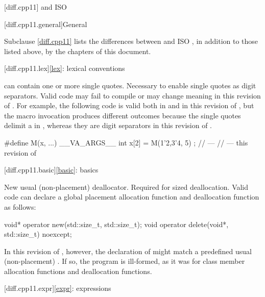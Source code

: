 [diff.cpp11]{\Cpp{} and ISO \CppXI{}}

[diff.cpp11.general]{General}

\pnum
{}%
Subclause \ref{diff.cpp11} lists the differences between \Cpp{} and
ISO \CppXI{},
in addition to those listed above,
by the chapters of this document.

[diff.cpp11.lex]{\ref{lex}: lexical conventions}

\change
{} can contain one or more single quotes.
\rationale
Necessary to enable single quotes as digit separators.
\effect
Valid \CppXI{} code may fail to compile or may change meaning in this
revision of \Cpp{}. For example, the following code is valid both in \CppXI{} and in
this revision of \Cpp{}, but the macro invocation produces different outcomes
because the single quotes delimit a  in \CppXI{}, whereas they are digit
separators in this revision of \Cpp{}.
\begin{example}
\begin{codeblock}
#define M(x, ...) __VA_ARGS__
int x[2] = { M(1'2,3'4, 5) };
//  --- \CppXI{}
//  --- this revision of \Cpp{}
\end{codeblock}
\end{example}

[diff.cpp11.basic]{\ref{basic}: basics}

\change
New usual (non-placement) deallocator.
\rationale
Required for sized deallocation.
\effect
Valid \CppXI{} code can declare a global placement allocation function and
deallocation function as follows:
\begin{codeblock}
void* operator new(std::size_t, std::size_t);
void operator delete(void*, std::size_t) noexcept;
\end{codeblock}
In this revision of \Cpp{}, however, the declaration of 
might match a predefined usual (non-placement)
. If so, the
program is ill-formed, as it was for class member allocation functions and
deallocation functions.

[diff.cpp11.expr]{\ref{expr}: expressions}

